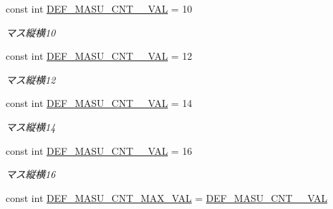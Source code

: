\begin{DoxyCompactItemize}
\mbox{\label{class_reversi_form_1_1_reversi_const_a655dba0de2f0cd9885fe663c02dfe0d3}} 
const int \hyperlink{class_reversi_form_1_1_reversi_const_a655dba0de2f0cd9885fe663c02dfe0d3}{D\+E\+F\+\_\+\+M\+A\+S\+U\+\_\+\+C\+N\+T\+\_\+\_\+\+V\+AL} = 10
\begin{DoxyCompactList}\small\item\em マス縦横10 \end{DoxyCompactList}\item 
\mbox{\label{class_reversi_form_1_1_reversi_const_a28bb2dccdffe2d0a31b20271520f96af}} 
const int \hyperlink{class_reversi_form_1_1_reversi_const_a28bb2dccdffe2d0a31b20271520f96af}{D\+E\+F\+\_\+\+M\+A\+S\+U\+\_\+\+C\+N\+T\+\_\+\_\+\+V\+AL} = 12
\begin{DoxyCompactList}\small\item\em マス縦横12 \end{DoxyCompactList}\item 
\mbox{\label{class_reversi_form_1_1_reversi_const_a1210cb5b0328716b3417fcf6cf7af080}} 
const int \hyperlink{class_reversi_form_1_1_reversi_const_a1210cb5b0328716b3417fcf6cf7af080}{D\+E\+F\+\_\+\+M\+A\+S\+U\+\_\+\+C\+N\+T\+\_\+\_\+\+V\+AL} = 14
\begin{DoxyCompactList}\small\item\em マス縦横14 \end{DoxyCompactList}\item 
\mbox{\label{class_reversi_form_1_1_reversi_const_ab06ffa7f1dedb1f6dd87302dae0e265d}} 
const int \hyperlink{class_reversi_form_1_1_reversi_const_ab06ffa7f1dedb1f6dd87302dae0e265d}{D\+E\+F\+\_\+\+M\+A\+S\+U\+\_\+\+C\+N\+T\+\_\+\_\+\+V\+AL} = 16
\begin{DoxyCompactList}\small\item\em マス縦横16 \end{DoxyCompactList}\item 
\mbox{\label{class_reversi_form_1_1_reversi_const_a29703c47577bfa8f0235f1695d6fd3c3}} 
const int \hyperlink{class_reversi_form_1_1_reversi_const_a29703c47577bfa8f0235f1695d6fd3c3}{D\+E\+F\+\_\+\+M\+A\+S\+U\+\_\+\+C\+N\+T\+\_\+\+M\+A\+X\+\_\+\+V\+AL} = \hyperlink{class_reversi_form_1_1_reversi_const_ab06ffa7f1dedb1f6dd87302dae0e265d}{D\+E\+F\+\_\+\+M\+A\+S\+U\+\_\+\+C\+N\+T\+\_\+\_\+\+V\+AL}

\end{DoxyCompactItemize}
